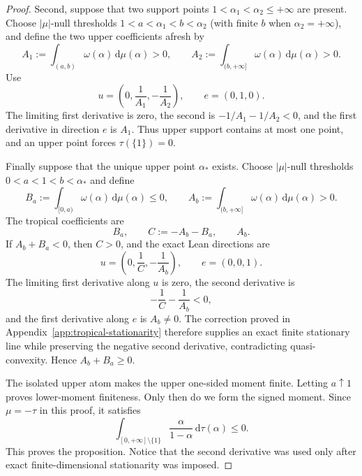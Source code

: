 \documentclass[aps,pra,11pt,onecolumn,nofootinbib,tightenlines]{revtex4-2}
\theoremstyle{definition}
\begin{document}
\begin{proof}
Second, suppose that two support points
$1<\alpha_1<\alpha_2\leq+\infty$ are present.  Choose $|\mu|$-null thresholds
$1<a<\alpha_1<b<\alpha_2$ (with finite $b$ when
$\alpha_2=+\infty$), and define the two upper coefficients afresh by
\begin{equation}
 A_1:=\int_{(a,b)}\omega(\alpha)\,\mathrm d\mu(\alpha)>0,
 \qquad
 A_2:=\int_{(b,+\infty]}\omega(\alpha)\,\mathrm d\mu(\alpha)>0.
 \label{eq:tropical-two-upper-coefficients-local}
\end{equation}
Use
\begin{equation}
 u=\left(0,\frac1{A_1},-\frac1{A_2}\right),
 \qquad e=(0,1,0).
 \label{eq:tropical-two-upper-directions}
\end{equation}
The limiting first derivative is zero, the second is
$-1/A_1-1/A_2<0$, and the first derivative in direction $e$ is $A_1$.
Thus upper support contains at most one point, and an upper point forces
$\tau(\{1\})=0$.

Finally suppose that the unique upper point $\alpha_*$ exists.  Choose
$|\mu|$-null thresholds $0<a<1<b<\alpha_*$ and define
\begin{equation}
 B_a:=\int_{[0,a)}\omega(\alpha)\,\mathrm d\mu(\alpha)\leq0,
 \qquad
 A_b:=\int_{(b,+\infty]}\omega(\alpha)\,\mathrm d\mu(\alpha)>0.
 \label{eq:tropical-truncated-coefficients-local}
\end{equation}
The tropical coefficients are
\begin{equation}
 B_a,
 \qquad
 C:=-A_b-B_a,
 \qquad
 A_b.
 \label{eq:tropical-three-coefficients-main}
\end{equation}
If $A_b+B_a<0$, then $C>0$, and the exact Lean directions are
\begin{equation}
 u=\left(0,\frac1C,-\frac1{A_b}\right),
 \qquad e=(0,0,1).
 \label{eq:tropical-moment-velocities-main}
\end{equation}
The limiting first derivative along $u$ is zero, the second derivative is
\begin{equation}
 -\frac1C-\frac1{A_b}<0,
 \label{eq:tropical-moment-second-main}
\end{equation}
and the first derivative along $e$ is $A_b\neq0$.  The correction proved in
Appendix~\ref{app:tropical-stationarity} therefore supplies an exact finite
stationary line while preserving the negative second derivative, contradicting
quasi-convexity.  Hence $A_b+B_a\geq0$.

The isolated upper atom makes the upper one-sided moment finite.  Letting
$a\uparrow1$ proves lower-moment finiteness.  Only then do we form the signed
moment.  Since $\mu=-\tau$ in this proof, it satisfies
\begin{equation}
 \int_{[0,+\infty]\setminus\{1\}}
 \frac{\alpha}{1-\alpha}\,\mathrm d\tau(\alpha)
 \leq0.
 \label{eq:tropical-final-moment}
\end{equation}
This proves the proposition.  Notice that the second derivative was used only
after exact finite-dimensional stationarity was imposed.
\end{proof}
\end{document}
